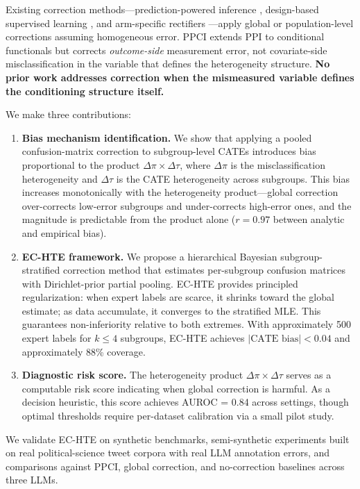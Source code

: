 \documentclass[11pt,a4paper]{article}
\begin{document}
Existing correction methods---prediction-powered inference \citep[PPI;][]{angelopoulos2023ppi}, design-based supervised learning \citep[DSL;][]{egami2024dsl}, and arm-specific rectifiers \citep{mozer2026}---apply global or population-level corrections assuming homogeneous error.
PPCI \citep{sui2026} extends PPI to conditional functionals but corrects \emph{outcome-side} measurement error, not covariate-side misclassification in the variable that defines the heterogeneity structure.
\textbf{No prior work addresses correction when the mismeasured variable defines the conditioning structure itself.}

We make three contributions:

\begin{enumerate}
\item \textbf{Bias mechanism identification.}
We show that applying a pooled confusion-matrix correction to subgroup-level CATEs introduces bias proportional to the product $\Delta\pi \times \Delta\tau$, where $\Delta\pi$ is the misclassification heterogeneity and $\Delta\tau$ is the CATE heterogeneity across subgroups.
This bias increases monotonically with the heterogeneity product---global correction over-corrects low-error subgroups and under-corrects high-error ones, and the magnitude is predictable from the product alone ($r = 0.97$ between analytic and empirical bias).

\item \textbf{EC-HTE framework.}
We propose a hierarchical Bayesian subgroup-stratified correction method that estimates per-subgroup confusion matrices with Dirichlet-prior partial pooling.
EC-HTE provides principled regularization: when expert labels are scarce, it shrinks toward the global estimate; as data accumulate, it converges to the stratified MLE.
This guarantees non-inferiority relative to both extremes.
With approximately 500 expert labels for $k \leq 4$ subgroups, EC-HTE achieves $|\text{CATE bias}| < 0.04$ and approximately 88\% coverage.

\item \textbf{Diagnostic risk score.}
The heterogeneity product $\Delta\pi \times \Delta\tau$ serves as a computable risk score indicating when global correction is harmful.
As a decision heuristic, this score achieves AUROC = 0.84 across settings, though optimal thresholds require per-dataset calibration via a small pilot study.
\end{enumerate}

We validate EC-HTE on synthetic benchmarks, semi-synthetic experiments built on real political-science tweet corpora with real LLM annotation errors, and comparisons against PPCI, global correction, and no-correction baselines across three LLMs.
\end{document}
